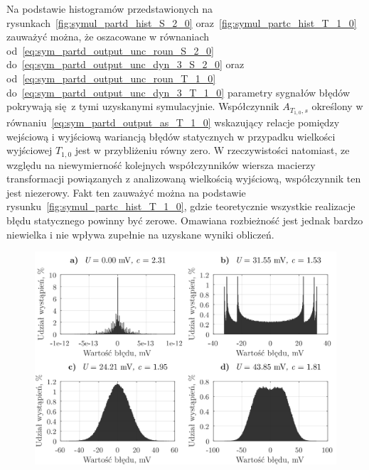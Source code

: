 Na podstawie histogramów przedstawionych na rysunkach~\ref{fig:symul_partd_hist_S_2_0} oraz~\ref{fig:symul_partc_hist_T_1_0} zauważyć można, że oszacowane w równaniach od~\eqref{eq:sym_partd_output_unc_roun_S_2_0} do~\eqref{eq:sym_partd_output_unc_dyn_3_S_2_0} oraz od~\eqref{eq:sym_partd_output_unc_roun_T_1_0} do~\eqref{eq:sym_partd_output_unc_dyn_3_T_1_0} parametry sygnałów błędów pokrywają się z tymi uzyskanymi symulacyjnie. Współczynnik $A_{T_{1,0},s} $ określony w równaniu~\eqref{eq:sym_partd_output_as_T_1_0} wskazujący relacje pomiędzy wejściową i wyjściową wariancją błędów statycznych w przypadku wielkości wyjściowej $T_{1,0}$ jest w przybliżeniu równy zero. W rzeczywistości natomiast, ze względu na niewymierność kolejnych współczynników wiersza macierzy transformacji powiązanych z analizowaną wielkością wyjściową, współczynnik ten jest niezerowy. Fakt ten zauważyć można na podstawie rysunku~\ref{fig:symul_partc_hist_T_1_0}, gdzie teoretycznie wszystkie realizacje błędu statycznego powinny być zerowe. Omawiana rozbieżność jest jednak bardzo niewielka i nie wpływa zupełnie na uzyskane wyniki obliczeń.

\begin{figure}[htb!]
\begin{center}
\includegraphics{obrazki/hist_part_T}
\end{center}
\end{figure}

